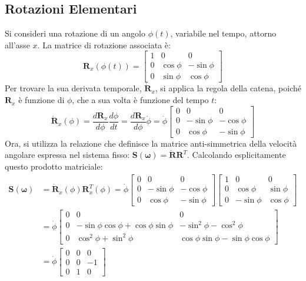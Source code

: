 ﻿\documentclass[11pt, a4paper]{article}
\begin{document}
\subsection{Rotazioni Elementari}
Si consideri una rotazione di un angolo \(\phi(t)\), variabile nel tempo, attorno all'asse \(x\). La matrice di rotazione associata è:
\[
    \bm{R}_x(\phi(t)) =
    \begin{bmatrix}
        1 & 0 & 0 \\
        0 & \cos\phi & -\sin\phi \\
        0 & \sin\phi & \cos\phi
    \end{bmatrix}
\]
Per trovare la sua derivata temporale, \(\dot{\bm{R}}_x\), si applica la regola della catena, poiché \(\bm{R}_x\) è funzione di \(\phi\), che a sua volta è funzione del tempo \(t\):
\[
    \dot{\bm{R}}_x(\phi) = \frac{d\bm{R}_x}{d\phi}\frac{d\phi}{dt} = \frac{d\bm{R}_x}{d\phi} \dot{\phi} =
    \dot{\phi}
    \begin{bmatrix}
        0 & 0 & 0 \\
        0 & -\sin\phi & -\cos\phi \\
        0 & \cos\phi & -\sin\phi
    \end{bmatrix}
\]
Ora, si utilizza la relazione che definisce la matrice anti-simmetrica della velocità angolare espressa nel sistema fisso: \(\bm{S}(\bm{\omega}) = \dot{\bm{R}}\bm{R}^T\). Calcolando esplicitamente questo prodotto matriciale:
\begin{align*}
    \bm{S}(\bm{\omega}) &= \dot{\bm{R}}_x(\phi)\bm{R}_x^T(\phi) =
    \dot{\phi}
    \begin{bmatrix}
        0 & 0 & 0 \\
        0 & -\sin\phi & -\cos\phi \\
        0 & \cos\phi & -\sin\phi
    \end{bmatrix}
    \begin{bmatrix}
        1 & 0 & 0 \\
        0 & \cos\phi & \sin\phi \\
        0 & -\sin\phi & \cos\phi
    \end{bmatrix} \\
    &=
    \dot{\phi}
    \begin{bmatrix}
        0 & 0 & 0 \\
        0 & -\sin\phi\cos\phi + \cos\phi\sin\phi & -\sin^2\phi - \cos^2\phi \\
        0 & \cos^2\phi + \sin^2\phi & \cos\phi\sin\phi - \sin\phi\cos\phi
    \end{bmatrix} \\
    &=
    \dot{\phi}
    \begin{bmatrix}
        0 & 0 & 0 \\
        0 & 0 & -1 \\
        0 & 1 & 0
    \end{bmatrix}
\end{align*}
\end{document}
